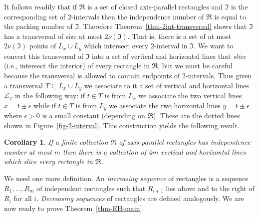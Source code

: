 \documentclass[
final
, nomarks
]{dmtcs-episciences}
\newtheorem{corollary}[theorem]{Corollary}
\begin{document}
It follows readily that if $\mathfrak{R}$ is a set of closed axis-parallel rectangles and $\mathfrak{I}$ is the corresponding set of $2$-intervals then the independence number of $\mathfrak{R}$ is equal to the packing number of $\mathfrak{I}$. Therefore Theorem~\ref{thm-2int-transversal} shows that $\mathfrak{I}$ has a transversal of size at most $2\nu(\mathfrak{I})$. That is, there is a set of at most $2\nu(\mathfrak{I})$ points of $L_x\cup L_y$ which intersect every $2$-interval in $\mathfrak{I}$. We want to convert this transversal of $\mathfrak{I}$ into a set of vertical and horizontal lines that \emph{slice} (i.e., intersect the interior) of every rectangle in $\mathfrak{R}$, but we must be careful because the transversal is allowed to contain endpoints of $2$-intervals. Thus given a transversal $T\subseteq L_x\cup L_y$ we associate to it a set of vertical and horizontal lines $\mathcal{L}_T$ in the following way: if $t\in T$ is from $L_x$ we associate the two vertical lines $x=t\pm\epsilon$ while if $t\in T$ is from $L_y$ we associate the two horizontal lines $y=t\pm\epsilon$ where $\epsilon>0$ is a small constant (depending on $\mathfrak{R}$). These are the dotted lines shown in Figure~\ref{fig-2-interval}. This construction yields the following result.

\begin{corollary}
\label{cor-2int-slice}
If a finite collection $\mathfrak{R}$ of axis-parallel rectangles has independence number at most $m$ then there is a collection of $4m$ vertical and horizontal lines which slice every rectangle in $\mathfrak{R}$.
\end{corollary}

We need one more definition. An {\it increasing sequence\/} of rectangles is a sequence $R_1,\dots,R_m$ of independent rectangles such that $R_{i+1}$ lies above and to the right of $R_i$ for all $i$. {\it Decreasing sequences\/} of rectangles are defined analogously. We are now ready to prove Theorem~\ref{thm-EH-main}.
\end{document}
